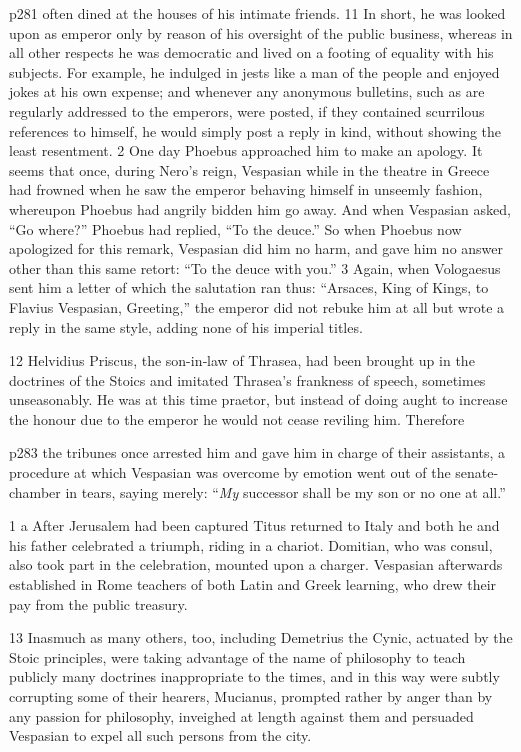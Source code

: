 p281 often dined at the houses of his intimate friends. 11 In short, he was looked upon as emperor only by reason of his oversight of the public business, whereas in all other respects he was democratic and lived on a footing of equality with his subjects. For example, he indulged in jests like a man of the people and enjoyed jokes at his own expense; and whenever any anonymous bulletins, such as are regularly addressed to the emperors, were posted, if they contained scurrilous references to himself, he would simply post a reply in kind, without showing the least resentment. 2 One day Phoebus approached him to make an apology. It seems that once, during Nero's reign, Vespasian while in the theatre in Greece had frowned when he saw the emperor behaving himself in unseemly fashion, whereupon Phoebus had angrily bidden him go away. And when Vespasian asked, ``Go where?'' Phoebus had replied, ``To the deuce.'' So when Phoebus now apologized for this remark, Vespasian did him no harm, and gave him no answer other than this same retort: ``To the deuce with you.'' 3 Again, when Vologaesus sent him a letter of which the salutation ran thus: ``Arsaces, King of Kings, to Flavius Vespasian, Greeting,'' the emperor did not rebuke him at all but wrote a reply in the same style, adding none of his imperial titles.

12
Helvidius Priscus, the son-in\texthebrew{‑}law of Thrasea, had been brought up in the doctrines of the Stoics and imitated Thrasea's frankness of speech, sometimes unseasonably. He was at this time praetor, but instead of doing aught to increase the honour due to the emperor he would not cease reviling him. Therefore

p283 the tribunes once arrested him and gave him in charge of their assistants, a procedure at which Vespasian was overcome by emotion went out of the senate-chamber in tears, saying merely: ``\emph{My} successor shall be my son or no one at all.''

1 a After Jerusalem had been captured Titus returned to Italy and both he and his father celebrated a triumph, riding in a chariot. Domitian, who was consul, also took part in the celebration, mounted upon a charger. Vespasian afterwards established in Rome teachers of both Latin and Greek learning, who drew their pay from the public treasury.

13
Inasmuch as many others, too, including Demetrius the Cynic, actuated by the Stoic principles, were taking advantage of the name of philosophy to teach publicly many doctrines inappropriate to the times, and in this way were subtly corrupting some of their hearers, Mucianus, prompted rather by anger than by any passion for philosophy, inveighed at length against them and persuaded Vespasian to expel all such persons from the city.

